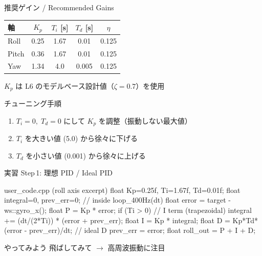 \begin{frame}{推奨ゲイン / Recommended Gains}
  \begin{table}
    \centering
    \begin{tabular}{lcccc}
      \hline
      \textbf{軸} & \textbf{$K_p$} & \textbf{$T_i$ [s]} & \textbf{$T_d$ [s]} & \textbf{$\eta$} \\
      \hline
      Roll  & 0.25 & 1.67 & 0.01  & 0.125 \\
      Pitch & 0.36 & 1.67 & 0.01  & 0.125 \\
      Yaw   & 1.34 & 4.0  & 0.005 & 0.125 \\
      \hline
    \end{tabular}
  \end{table}

  \vspace{0.3em}

  {\small $K_p$ は L6 のモデルベース設計値（$\zeta = 0.7$）を使用}

  \vspace{0.3em}

  \begin{block}{チューニング手順}
    \begin{enumerate}
      \item $T_i{=}0,\; T_d{=}0$ にして $K_p$ を調整（振動しない最大値）
      \item $T_i$ を大きい値 (5.0) から徐々に下げる
      \item $T_d$ を小さい値 (0.001) から徐々に上げる
    \end{enumerate}
  \end{block}
\end{frame}

\begin{frame}[fragile]{実習 Step\,1: 理想 PID / Ideal PID}
  \begin{sflisting}{user\_code.cpp (roll axis excerpt)}
float Kp=0.25f, Ti=1.67f, Td=0.01f;
float integral=0, prev_err=0;
// inside loop_400Hz(dt)
float error = target - ws::gyro_x();
float P = Kp * error;
if (Ti > 0)  // I term (trapezoidal)
    integral += (dt/(2*Ti)) * (error + prev_err);
float I = Kp * integral;
float D = Kp*Td*(error - prev_err)/dt; // ideal D
prev_err = error;
float roll_out = P + I + D;
  \end{sflisting}

  \begin{exampleblock}{やってみよう}
    飛ばしてみて $\to$ 高周波振動に注目
  \end{exampleblock}
\end{frame}

